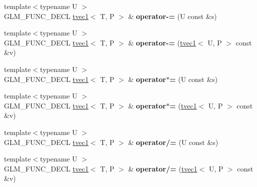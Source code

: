 \begin{DoxyCompactItemize}
\item 
\hypertarget{structglm_1_1tvec1_abf55a623f9a8fdbc5d6800c06b1ac491}{{\footnotesize template$<$typename U $>$ }\\G\-L\-M\-\_\-\-F\-U\-N\-C\-\_\-\-D\-E\-C\-L \hyperlink{structglm_1_1tvec1}{tvec1}$<$ T, P $>$ \& {\bfseries operator-\/=} (U const \&s)}\label{structglm_1_1tvec1_abf55a623f9a8fdbc5d6800c06b1ac491}

\item 
\hypertarget{structglm_1_1tvec1_ad2c5971147b89ac3a660d88296ec2a74}{{\footnotesize template$<$typename U $>$ }\\G\-L\-M\-\_\-\-F\-U\-N\-C\-\_\-\-D\-E\-C\-L \hyperlink{structglm_1_1tvec1}{tvec1}$<$ T, P $>$ \& {\bfseries operator-\/=} (\hyperlink{structglm_1_1tvec1}{tvec1}$<$ U, P $>$ const \&v)}\label{structglm_1_1tvec1_ad2c5971147b89ac3a660d88296ec2a74}

\item 
\hypertarget{structglm_1_1tvec1_a2674427b4e2f7a0e7cb19aadb4fc1245}{{\footnotesize template$<$typename U $>$ }\\G\-L\-M\-\_\-\-F\-U\-N\-C\-\_\-\-D\-E\-C\-L \hyperlink{structglm_1_1tvec1}{tvec1}$<$ T, P $>$ \& {\bfseries operator$\ast$=} (U const \&s)}\label{structglm_1_1tvec1_a2674427b4e2f7a0e7cb19aadb4fc1245}

\item 
\hypertarget{structglm_1_1tvec1_a3b881fe292b87649ebff1981800039ac}{{\footnotesize template$<$typename U $>$ }\\G\-L\-M\-\_\-\-F\-U\-N\-C\-\_\-\-D\-E\-C\-L \hyperlink{structglm_1_1tvec1}{tvec1}$<$ T, P $>$ \& {\bfseries operator$\ast$=} (\hyperlink{structglm_1_1tvec1}{tvec1}$<$ U, P $>$ const \&v)}\label{structglm_1_1tvec1_a3b881fe292b87649ebff1981800039ac}

\item 
\hypertarget{structglm_1_1tvec1_a9c7b5352502e133e1b7c4022a90bec22}{{\footnotesize template$<$typename U $>$ }\\G\-L\-M\-\_\-\-F\-U\-N\-C\-\_\-\-D\-E\-C\-L \hyperlink{structglm_1_1tvec1}{tvec1}$<$ T, P $>$ \& {\bfseries operator/=} (U const \&s)}\label{structglm_1_1tvec1_a9c7b5352502e133e1b7c4022a90bec22}

\item 
\hypertarget{structglm_1_1tvec1_a09ef15d7a57cbcf441eb01d3fc832b5d}{{\footnotesize template$<$typename U $>$ }\\G\-L\-M\-\_\-\-F\-U\-N\-C\-\_\-\-D\-E\-C\-L \hyperlink{structglm_1_1tvec1}{tvec1}$<$ T, P $>$ \& {\bfseries operator/=} (\hyperlink{structglm_1_1tvec1}{tvec1}$<$ U, P $>$ const \&v)}\label{structglm_1_1tvec1_a09ef15d7a57cbcf441eb01d3fc832b5d}


\end{DoxyCompactItemize}
